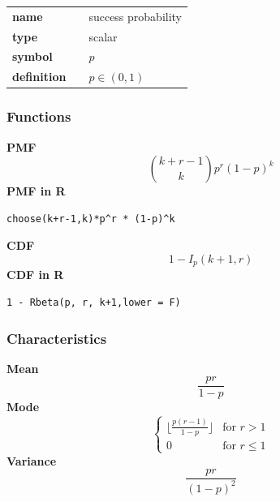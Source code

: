 \noindent\begin{tabular}{p{2cm}cl}
\textbf{name} & & success probability \\
\textbf{type} & & scalar \\
\textbf{symbol} & & $p$  \\
\textbf{definition} & & $p \in (0,1)$
\end{tabular}
\subsubsection*{Functions}

\smallskip \noindent \hspace{.2cm} \textbf{PMF} 
\begin{equation*}\binom {k+r-1}k p^r (1-p)^k\end{equation*}
\smallskip \noindent \hspace{.2cm} \textbf{PMF in R}  
\begin{verbatim}choose(k+r-1,k)*p^r * (1-p)^k\end{verbatim}
\smallskip \noindent \hspace{.2cm} \textbf{CDF} 
\begin{equation*}1 - I_{p}(k+1, r)\end{equation*}
\smallskip \noindent \hspace{.2cm} \textbf{CDF in R} 
\begin{verbatim}1 - Rbeta(p, r, k+1,lower = F)\end{verbatim}
\smallskip
\subsubsection*{Characteristics}
\smallskip \noindent \hspace{.2cm} \textbf{Mean} 
\begin{equation*}\frac{pr}{1-p}\end{equation*}
\smallskip \noindent \hspace{.2cm} \textbf{Mode} 
\begin{equation*}\begin{cases}
\lfloor \frac{p(r-1)}{1-p} \rfloor & \text{for } r > 1 \\ 
0 & \text{for } r \leq 1 
\end{cases}\end{equation*}
\smallskip \noindent \hspace{.2cm} \textbf{Variance} 
\begin{equation*}\frac{pr}{(1-p)^2}\end{equation*}
\smallskip
